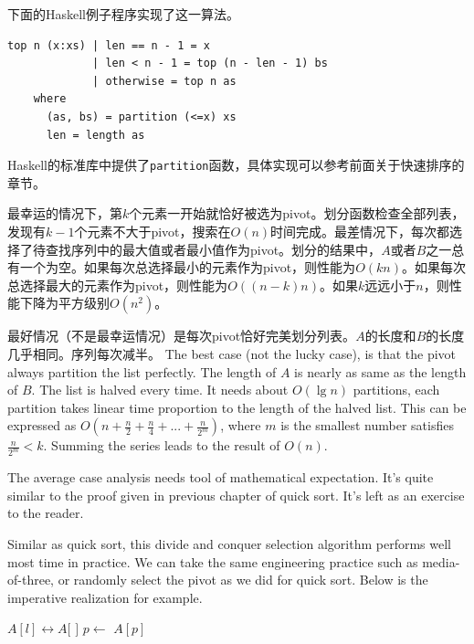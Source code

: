 \documentclass[UTF8]{article}
\begin{document}
下面的Haskell例子程序实现了这一算法。

\lstset{language=Haskell}
\begin{lstlisting}
top n (x:xs) | len == n - 1 = x
             | len < n - 1 = top (n - len - 1) bs
             | otherwise = top n as
    where
      (as, bs) = partition (<=x) xs
      len = length as
\end{lstlisting}

Haskell的标准库中提供了\texttt{partition}函数，具体实现可以参考前面关于快速排序的章节。

最幸运的情况下，第$k$个元素一开始就恰好被选为pivot。划分函数检查全部列表，发现有$k-1$个元素不大于pivot，搜索在$O(n)$时间完成。最差情况下，每次都选择了待查找序列中的最大值或者最小值作为pivot。划分的结果中，$A$或者$B$之一总有一个为空。如果每次总选择最小的元素作为pivot，则性能为$O(kn)$。如果每次总选择最大的元素作为pivot，则性能为$O((n-k)n)$。如果$k$远远小于$n$，则性能下降为平方级别$O(n^2)$。

最好情况（不是最幸运情况）是每次pivot恰好完美划分列表。$A$的长度和$B$的长度几乎相同。序列每次减半。
The best case (not the lucky case), is that the pivot always partition the list perfectly.
The length of $A$ is nearly as same as the length of $B$. The list is halved
every time. It needs about $O(\lg n)$ partitions, each partition takes linear time proportion
to the length of the halved list. This can be expressed as
$O(n + \frac{n}{2} + \frac{n}{4} + ... + \frac{n}{2^m})$, where $m$ is the smallest number satisfies
$\frac{n}{2^m} < k$. Summing the series leads to the result of $O(n)$.

The average case analysis needs tool of mathematical expectation. It's quite similar to the
proof given in previous chapter of quick sort. It's left as an exercise to the reader.

Similar as quick sort, this divide and conquer selection algorithm performs well most time
in practice. We can take the same engineering practice such as media-of-three, or randomly
select the pivot as we did for quick sort. Below is the imperative realization for example.

\begin{algorithmic}[1]
  \State {} $A[l] \leftrightarrow A[$  $]$ 
  \State $p \gets$ 
    \State \Return $A[p]$
  \EndIf
    \State \Return {}
  \EndIf
  \State \Return {}
\EndFunction
\end{algorithmic}
\end{document}
